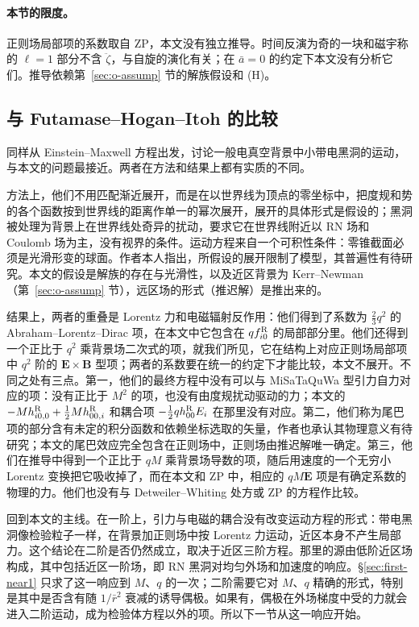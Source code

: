 \documentclass[11pt,a4paper]{ctexart}
\begin{document}
\paragraph{本节的限度。}正则场局部项的系数取自 ZP，本文没有独立推导。时间反演为奇的一块和磁宇称的 $\ell=1$ 部分不含 $\ddot\zeta$，与自旋的演化有关；在 $\bar a=0$ 的约定下本文没有分析它们。推导依赖第~\ref{sec:o-assump} 节的解族假设和 (H)。

\subsection{与 Futamase--Hogan--Itoh 的比较}\label{sec:first-FHI}

\citet{FutamaseHoganItoh2008} 同样从 Einstein--Maxwell 方程出发，讨论一般电真空背景中小带电黑洞的运动，与本文的问题最接近。两者在方法和结果上都有实质的不同。

方法上，他们不用匹配渐近展开，而是在以世界线为顶点的零坐标中，把度规和势的各个函数按到世界线的距离作单一的幂次展开，展开的具体形式是假设的；黑洞被处理为背景上在世界线处奇异的扰动，要求它在世界线附近以 RN 场和 Coulomb 场为主，没有视界的条件。运动方程来自一个可积性条件：零锥截面必须是光滑形变的球面。作者本人指出，所假设的展开限制了模型，其普遍性有待研究。本文的假设是解族的存在与光滑性，以及近区背景为 Kerr--Newman（第~\ref{sec:o-assump} 节），远区场的形式（推迟解）是推出来的。

结果上，两者的重叠是 Lorentz 力和电磁辐射反作用：他们得到了系数为 $\tfrac23q^2$ 的 Abraham--Lorentz--Dirac 项，在本文中它包含在 $qf^{\rm R}_{i0}$ 的局部部分里。他们还得到一个正比于 $q^2$ 乘背景场二次式的项，就我们所见，它在结构上对应正则场局部项中 $q^2$ 阶的 $\boldsymbol E\times\boldsymbol B$ 型项；两者的系数要在统一的约定下才能比较，本文不展开。不同之处有三点。第一，他们的最终方程中没有可以与 MiSaTaQuWa 型引力自力对应的项：没有正比于 $M^2$ 的项，也没有由度规扰动驱动的力；本文的 $-Mh^{\rm R}_{i0,0}+\tfrac12Mh^{\rm R}_{00,i}$ 和耦合项 $-\tfrac12qh^{\rm R}_{00}E_i$ 在那里没有对应。第二，他们称为尾巴项的部分含有未定的积分函数和依赖坐标选取的矢量，作者也承认其物理意义有待研究；本文的尾巴效应完全包含在正则场中，正则场由推迟解唯一确定。第三，他们在推导中得到一个正比于 $qM$ 乘背景场导数的项，随后用速度的一个无穷小 Lorentz 变换把它吸收掉了，而在本文和 ZP 中，相应的 $qM\dot{\boldsymbol E}$ 项是有确定系数的物理的力。他们也没有与 Detweiler--Whiting 处方或 ZP 的方程作比较。

回到本文的主线。在一阶上，引力与电磁的耦合没有改变运动方程的形式：带电黑洞像检验粒子一样，在背景加正则场中按 Lorentz 力运动，近区本身不产生局部力。这个结论在二阶是否仍然成立，取决于近区三阶方程。那里的源由低阶近区场构成，其中包括近区一阶场，即 RN 黑洞对均匀外场和加速度的响应。\S\ref{sec:first-near1} 只求了这一响应到 $M$、$q$ 的一次；二阶需要它对 $M$、$q$ 精确的形式，特别是其中是否含有随 $1/\bar r^2$ 衰减的诱导偶极。如果有，偶极在外场梯度中受的力就会进入二阶运动，成为检验体方程以外的项。所以下一节从这一响应开始。
\end{document}
